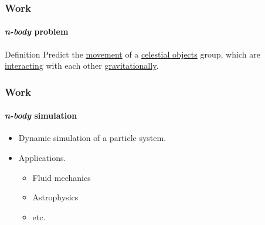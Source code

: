 \frame
{
\frametitle{Work}
\framesubtitle{\emph{n-body} problem}
\begin{block}{Definition}
    Predict the \underline{movement} of a \underline{celestial objects} group,
    which are \underline{interacting} with each other \underline{gravitationally}.
\end{block}
}

\frame
{
\frametitle{Work}
\framesubtitle{\emph{n-body} simulation}
\begin{itemize}
    \item Dynamic simulation of a particle system.
    \item Applications.
    \begin{itemize}
        \item Fluid mechanics
        \item Astrophysics
        \item etc.
    \end{itemize}
\end{itemize}
}



